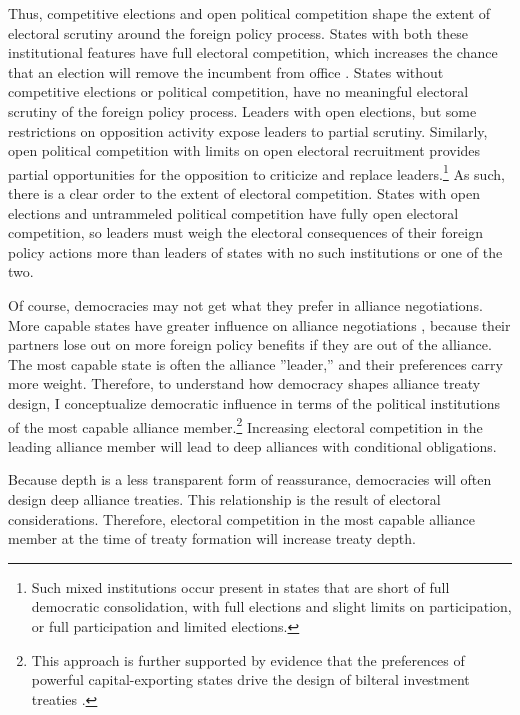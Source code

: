\documentclass[12pt]{article}
\begin{document}
Thus, competitive elections and open political competition shape the extent of electoral scrutiny around the foreign policy process.
States with both these institutional features have full electoral competition, which increases the chance that an election will remove the incumbent from office \citep{HydeMarinov2012}. 
States without competitive elections or political competition, have no meaningful electoral scrutiny of the foreign policy process.
Leaders with open elections, but some restrictions on opposition activity expose leaders to partial scrutiny. 
Similarly, open political competition with limits on open electoral recruitment provides partial opportunities for the opposition to criticize and replace leaders.\footnote{Such mixed institutions occur present in states that are short of full democratic consolidation, with full elections and slight limits on participation, or full participation and limited elections.}
As such, there is a clear order to the extent of electoral competition.
States with open elections and untrammeled political competition have fully open electoral competition, so leaders must weigh the electoral consequences of their foreign policy actions more than leaders of states with no such institutions or one of the two. 


Of course, democracies may not get what they prefer in alliance negotiations. 
More capable states have greater influence on alliance negotiations \citep{Mattes2012}, because their partners lose out on more foreign policy benefits if they are out of the alliance.
The most capable state is often the alliance ''leader,'' and their preferences carry more weight. 
Therefore, to understand how democracy shapes alliance treaty design, I conceptualize democratic influence in terms of the political institutions of the most capable alliance member.\footnote{This approach is further supported by evidence that the preferences of powerful capital-exporting states drive the design of bilteral investment treaties \citep{AlleePeinhardt2014}.} 
Increasing electoral competition in the leading alliance member will lead to deep alliances with conditional obligations. 


Because depth is a less transparent form of reassurance, democracies will often design deep alliance treaties. 
This relationship is the result of electoral considerations. 
Therefore, electoral competition in the most capable alliance member at the time of treaty formation will increase treaty depth. 
\end{document}
